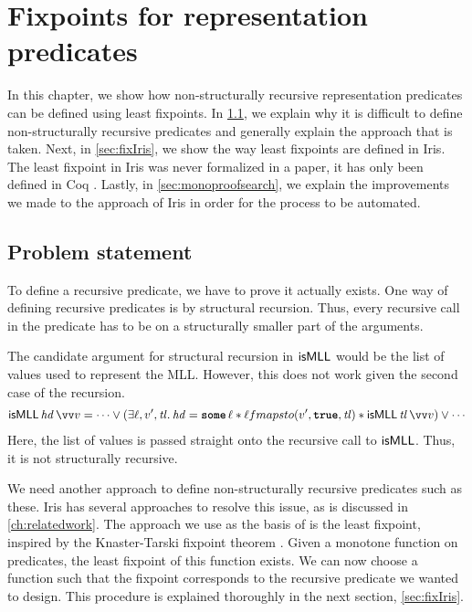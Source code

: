 \documentclass[thesis.tex]{subfiles}
\begin{document}
\chapter{Fixpoints for representation predicates} \label{ch:fixpoints}
In this chapter, we show how non-structurally recursive representation predicates can be defined using least fixpoints. In \cref{sec:fixproblem}, we explain why it is difficult to define non-structurally recursive predicates and generally explain the approach that is taken. Next, in \cref{sec:fixIris}, we show the way least fixpoints are defined in Iris. The least fixpoint in Iris was never formalized in a paper, it has only been defined in Coq \cite{krebbersIris2024}. Lastly, in \cref{sec:monoproofsearch}, we explain the improvements we made to the approach of Iris in order for the process to be automated.

\section{Problem statement} \label{sec:fixproblem}
To define a recursive predicate, we have to prove it actually exists. One way of defining recursive predicates is by structural recursion. Thus, every recursive call in the predicate has to be on a structurally smaller part of the arguments.

The candidate argument for structural recursion in $\textsf{\upshape isMLL}$ would be the list of values used to represent the MLL. However, this does not work given the second case of the recursion.
\begin{align*}
    \isMLL\,\hd\,\vect{\val} = \cdots \lor (\Exists \loc, \val', \tl. \hd = \Some \loc * \loc fmapsto (\val', \True, \tl) * \isMLL\, \tl\, \vect{\val}) \lor \cdots
\end{align*}
Here, the list of values is passed straight onto the recursive call to $\textsf{\upshape isMLL}$. Thus, it is not structurally recursive.

We need another approach to define non-structurally recursive predicates such as these. Iris has several approaches to resolve this issue, as is discussed in \cref{ch:relatedwork}. The approach we use as the basis of  is the least fixpoint, inspired by the Knaster-Tarski fixpoint theorem \cite*{tarskiLatticetheoreticalFixpointTheorem1955}. Given a monotone function on predicates, the least fixpoint of this function exists. We can now choose a function such that the fixpoint corresponds to the recursive predicate we wanted to design. This procedure is explained thoroughly in the next section, \cref{sec:fixIris}.
\end{document}
